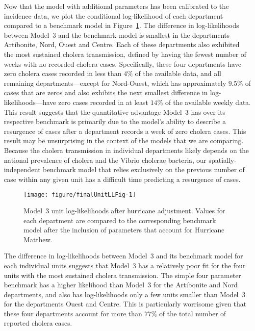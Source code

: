 Now that the model with additional parameters has been calibrated to the incidence data, we plot the conditional log-likelihood of each department compared to a benchmark model in Figure~\ref{fig:finalUnitLL}.
The difference in log-likelihoods between Model~3 and the benchmark model is smallest in the departments Artibonite, Nord, Ouest and Centre.
Each of these departments also exhibited the most sustained cholera transmission, defined by having the fewest number of weeks with no recorded cholera cases.
Specifically, these four departments have zero cholera cases recorded in less than $4\%$ of the available data, and all remaining departments---except for Nord-Ouest, which has approximately $9.5\%$ of cases that are zeros and also exhibits the next smallest difference in log-likelihoods---have zero cases recorded in at least $14\%$ of the available weekly data.
This result suggests that the quantitative advantage Model~3 has over its respective benchmark is primarily due to the model's ability to describe a resurgence of cases after a department records a week of zero cholera cases.
This result may be unsurprising in the context of the models that we are comparing.
Because the cholera transmission in individual departments likely depends on the national prevalence of cholera and the Vibrio cholerae bacteria, our spatially-independent benchmark model that relies exclusively on the previous number of case within any given unit has a difficult time predicting a resurgence of cases.

\begin{figure}[!ht]
\begin{knitrout}
\color{fgcolor}

{\centering \texttt{[image: figure/finalUnitLLFig-1]} 

}


\end{knitrout}
\caption[Model~3 unit log-likelihoods after hurricane adjustment.]{\label{fig:finalUnitLL}Model~3 unit log-likelihoods after hurricane adjustment. Values for each department are compared to the corresponding benchmark model after the inclusion of parameters that account for Hurricane Matthew.}
\end{figure}

The difference in log-likelihoods between Model~3 and its benchmark model for each individual units suggests that Model~3 has a relatively poor fit for the four units with the most sustained cholera transmission.
The simple four parameter benchmark has a higher likelihood than Model~3 for the Artibonite and Nord departments, and also has log-likelihoods only a few units smaller than Model~3 for the departments Ouest and Centre.
This is particularly worrisome given that these four departments account for more than $77\%$ of the total number of reported cholera cases.


